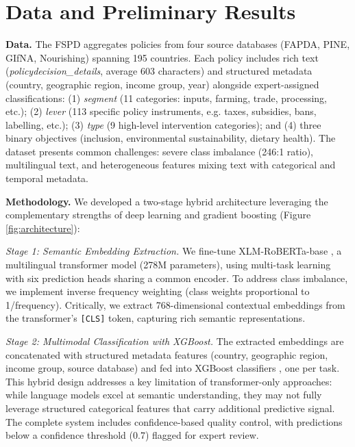 \documentclass[a4paper,12pt]{article}
\begin{document}
\section*{Data and Preliminary Results}

\textbf{Data.} The FSPD aggregates policies from four source databases (FAPDA, PINE, GIfNA, Nourishing) spanning 195 countries. Each policy includes rich text (\textit{policydecision\_details}, average 603 characters) and structured metadata (country, geographic region, income group, year) alongside expert-assigned classifications: (1) \textit{segment} (11 categories: inputs, farming, trade, processing, etc.); (2) \textit{lever} (113 specific policy instruments, e.g. taxes, subsidies, bans, labelling, etc.); (3) \textit{type} (9 high-level intervention categories); and (4) three binary objectives (inclusion, environmental sustainability, dietary health). The dataset presents common challenges: severe class imbalance (246:1 ratio), multilingual text, and heterogeneous features mixing text with categorical and temporal metadata.
\newline

\noindent\textbf{Methodology.} We developed a two-stage hybrid architecture leveraging the complementary strengths of deep learning and gradient boosting (Figure \ref{fig:architecture}):

\textit{Stage 1: Semantic Embedding Extraction.} We fine-tune XLM-RoBERTa-base \cite{conneau2020}, a multilingual transformer model (278M parameters), using multi-task learning with six prediction heads sharing a common encoder. To address class imbalance, we implement inverse frequency weighting (class weights proportional to 1/frequency). Critically, we extract 768-dimensional contextual embeddings from the transformer's \texttt{[CLS]} token, capturing rich semantic representations.

\textit{Stage 2: Multimodal Classification with XGBoost.} The extracted embeddings are concatenated with structured metadata features (country, geographic region, income group, source database) and fed into XGBoost classifiers \cite{chen2016}, one per task. This hybrid design addresses a key limitation of transformer-only approaches: while language models excel at semantic understanding, they may not fully leverage structured categorical features that carry additional predictive signal. The complete system includes confidence-based quality control, with predictions below a confidence threshold (0.7) flagged for expert review.
\end{document}
